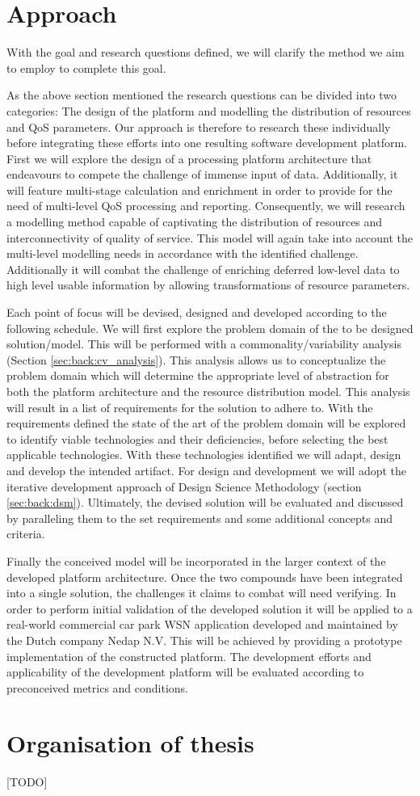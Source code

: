 \section{Approach}
With the goal and research questions defined, we will clarify the method we aim to employ to complete this goal.

As the above section mentioned the research questions can be divided into two categories: The design of the platform and modelling the distribution of resources and QoS parameters. Our approach is therefore to research these individually before integrating these efforts into one resulting software development platform. First we will explore the design of a processing platform architecture that endeavours to compete the challenge of immense input of data. Additionally, it will feature multi-stage calculation and enrichment in order to provide for the need of multi-level QoS processing and reporting. Consequently, we will research a modelling method capable of captivating the distribution of resources and interconnectivity of quality of service. This model will again take into account the multi-level modelling needs in accordance with the identified challenge. Additionally it will combat the challenge of enriching deferred low-level data to high level usable information by allowing transformations of resource parameters. 

Each point of focus will be devised, designed and developed according to the following schedule. We will first explore the problem domain of the to be designed solution/model. This will be performed with a commonality/variability analysis (Section \ref{sec:back:cv_analysis}). This analysis allows us to conceptualize the problem domain which will determine the appropriate level of abstraction for both the platform architecture and the resource distribution model. This analysis will result in a list of requirements for the solution to adhere to. With the requirements defined the state of the art of the problem domain will be explored to identify viable technologies and their deficiencies, before selecting the best applicable technologies. With these technologies identified we will adapt, design and develop the intended artifact. For design and development we will adopt the iterative development approach of Design Science Methodology\cite{dsm} (section \ref{sec:back:dsm}). Ultimately, the devised solution will be evaluated and discussed by paralleling them to the set requirements and some additional concepts and criteria. 

Finally the conceived model will be incorporated in the larger context of the developed platform architecture. Once the two compounds have been integrated into a single solution, the challenges it claims to combat will need verifying. In order to perform initial validation of the developed solution it will be applied to a real-world commercial car park WSN application developed and maintained by the Dutch company Nedap N.V. This will be achieved by providing a prototype implementation of the constructed platform. The development efforts and applicability of the development platform will be evaluated according to preconceived metrics and conditions.


\section{Organisation of thesis}
[TODO]